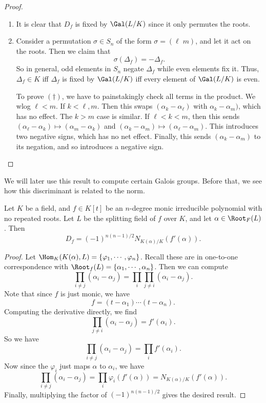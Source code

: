 \documentclass[a4paper]{article}
\begin{document}
\begin{proof}\leavevmode
  \begin{enumerate}
    \item It is clear that $D_f$ is fixed by $\Gal(L/K)$ since it only permutes the roots.
    \item Consider a permutation $\sigma \in S_n$ of the form $\sigma = (\ell \;m)$, and let it act on the roots. Then we claim that
      \[
        \sigma(\Delta_f) = - \Delta_f.\tag{$\dagger$}
      \]
      So in general, odd elements in $S_n$ negate $\Delta_f$ while even elements fix it. Thus, $\Delta_f \in K$ iff $\Delta_f$ is fixed by $\Gal(L/K)$ iff every element of $\Gal(L/K)$ is even.

      To prove $(\dagger)$, we have to painstakingly check all terms in the product. We wlog $\ell < m$. If $k < \ell, m$. Then this swaps $(\alpha_k - \alpha_\ell)$ with $\alpha_k - \alpha_m)$, which has no effect. The $k > m$ case is similar. If $\ell < k < m$, then this sends $(\alpha_\ell - \alpha_k) \mapsto (\alpha_m - \alpha_k)$ and $(\alpha_k - \alpha_m) \mapsto (\alpha_\ell - \alpha_m)$. This introduces two negative signs, which has no net effect. Finally, this sends $(\alpha_k - \alpha_m)$ to its negation, and so introduces a negative sign.

  \end{enumerate}
\end{proof}
We will later use this result to compute certain Galois groups. Before that, we see how this discriminant is related to the norm.

\begin{thm}
  Let $K$ be a field, and $f \in K[t]$ be an $n$-degree monic irreducible polynomial with no repeated roots. Let $L$ be the splitting field of $f$ over $K$, and let $\alpha \in \Root_F(L)$. Then
  \[
    D_f = (-1)^{n(n - 1)/2} N_{K(\alpha)/K}(f'(\alpha)).
  \]
\end{thm}

\begin{proof}
  Let $\Hom_K(K(\alpha), L) = \{\varphi_1, \cdots, \varphi_n\}$. Recall these are in one-to-one correspondence with $\Root_f(L) = \{\alpha_1, \cdots, \alpha_n\}$. Then we can compute
  \[
    \prod_{i \not= j} (\alpha_i - \alpha_j) = \prod_i \prod_{j \not= i} (\alpha_i - \alpha_j).
  \]
  Note that since $f$ is just monic, we have
  \[
    f = (t - \alpha_1) \cdots (t - \alpha_n).
  \]
  Computing the derivative directly, we find
  \[
    \prod_{j \not= i} (\alpha_i - \alpha_j) = f'(\alpha_i).
  \]
  So we have
  \[
    \prod_{i \not= j} (\alpha_i - \alpha_j) = \prod_i f'(\alpha_i).
  \]
  Now since the $\varphi_i$ just maps $\alpha$ to $\alpha_i$, we have
  \[
    \prod_{i \not= j} (\alpha_i - \alpha_j) = \prod_i \varphi_i (f'(\alpha)) = N_{K(\alpha)/K}(f'(\alpha)).
  \]
  Finally, multiplying the factor of $(-1)^{n(n - 1)/2}$ gives the desired result.
\end{proof}
\end{document}
